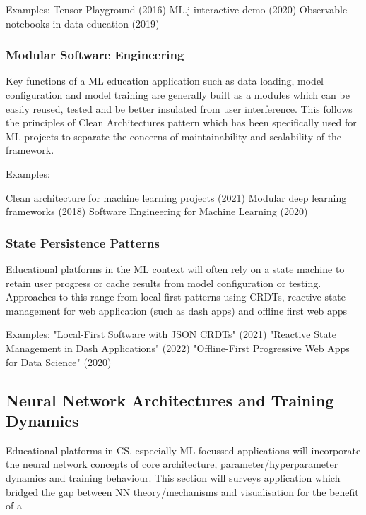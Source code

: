 \documentclass{article}
\begin{document}
Examples:
Tensor Playground (2016)
ML.j interactive demo (2020)
Observable notebooks in data education (2019)

\subsubsection{Modular Software Engineering}
Key functions of a ML education application such as data loading, model configuration and model training are generally built as a modules which can be easily reused, tested and be better insulated from user interference. This follows the principles of Clean Architectures pattern which has been specifically used for ML projects to separate the concerns of maintainability and scalability of the framework.

Examples:

Clean architecture for machine learning projects (2021)
Modular deep learning frameworks (2018)
Software Engineering for Machine Learning (2020)

\subsubsection{State Persistence Patterns}
Educational platforms in the ML context will often rely on a state machine to retain user progress or cache results from model configuration or testing. Approaches to this range from local-first patterns using CRDTs, reactive state management for web application (such as dash apps) and offline first web apps %

Examples:
"Local-First Software with JSON CRDTs" (2021)
"Reactive State Management in Dash Applications" (2022)
"Offline-First Progressive Web Apps for Data Science" (2020)

\subsection{Neural Network Architectures and Training Dynamics} %
Educational platforms in CS, especially ML focussed applications will incorporate the neural network concepts of core architecture, parameter/hyperparameter dynamics and training behaviour. This section will surveys application which bridged the gap between NN theory/mechanisms and visualisation for the benefit of a 
\end{document}
